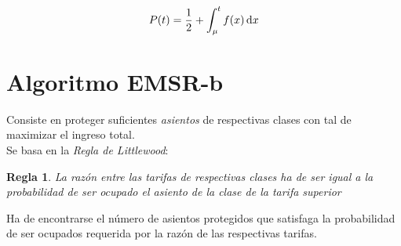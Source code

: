 \documentclass[12pt]{article}
\newtheorem{regla}{Regla}
\begin{document}
\begin{align}
P(t) = \dfrac{1}{2} + \int_\mu^t f(x)\dif x
\end{align}


\section{Algoritmo EMSR-b}

Consiste en proteger suficientes \emph{asientos} de respectivas clases con tal de maximizar el ingreso total.\\

Se basa en la \emph{Regla de Littlewood}:

\begin{regla}
La razón entre las tarifas de respectivas clases ha de ser igual a la probabilidad de ser ocupado el asiento de la clase de la tarifa superior
\end{regla}


Ha de encontrarse el número de asientos protegidos que satisfaga la probabilidad de ser ocupados requerida por la razón de las respectivas tarifas.
\end{document}
